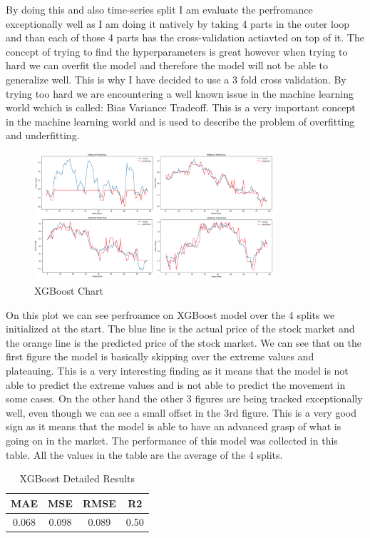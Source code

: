 \documentclass{imc-inf}
\begin{document}
			By doing this and also time-series split I am evaluate the perfromance exceptionally well as I am doing it natively by taking 4 parts in the outer loop and than each of those 4 parts has the cross-validation actiavted on top of it.
			The concept of trying to find the hyperparameters is great however when trying to hard we can overfit the model and therefore the model will not be able to generalize well. This is why I have decided to use a 3 fold cross validation.
			By trying too hard we are encountering a well known issue in the machine learning world wchich is called: Bias Variance Tradeoff. This is a very important concept in the machine learning world and is used to describe the problem of overfitting
			and underfitting. 
			\begin{figure}[h]
				\centering
				\includegraphics[width=0.8\textwidth]{xgboost_chart.png}
				\caption{XGBoost Chart}
				\label{fig:xgboost_chart}
			\end{figure}
			On this plot we can see perfroamce on XGBoost model over the 4 splits we initialized at the start. The blue line is the actual price of the stock market and the orange line is the predicted price of the stock market.
			We can see that on the first figure the model is basically skipping over the extreme values and plateauing. This is a very interesting finding as it means that the model is not able to predict the extreme values and is not able to predict the 
			movement in some cases. On the other hand the other 3 figures are being tracked exceptionally well, even though we can see a small offset in the 3rd figure. This is a very good sign as it means that the model is able to have an 
			advanced grasp of what is going on in the market. The performance of this model was collected in this table. All the values in the table are the average of the 4 splits.
			\begin{table}[h!]
				\centering
				\begin{tabular}{|c|c|c|c|}
					\hline
					\textbf{MAE} & \textbf{MSE} & \textbf{RMSE} & \textbf{R2} \\ \hline
					0.068 & 0.098 & 0.089 & 0.50 \\ \hline
				\end{tabular}
				\caption{XGBoost Detailed Results}
				\label{tab:xgboost_detailed_results}
			\end{table}
\end{document}

